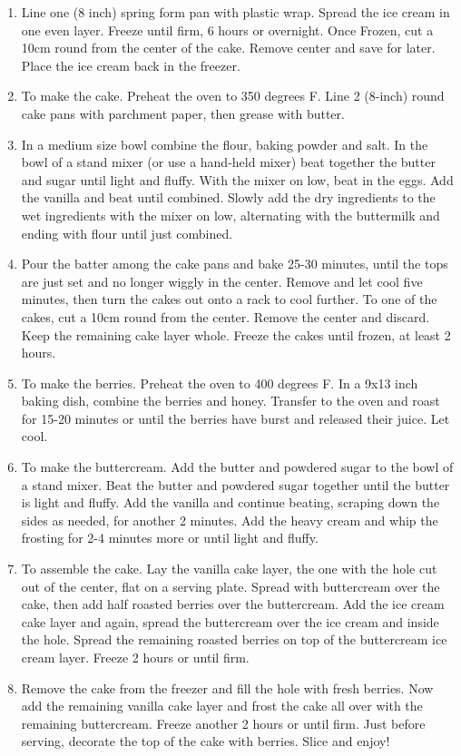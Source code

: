 \documentclass[
  letterpaper,
  DIV=11,
  numbers=noendperiod,
  titlepage=false]{scrreprt}
\providecommand{\tightlist}{%
  \setlength{\itemsep}{0pt}\setlength{\parskip}{0pt}}\usepackage{longtable,booktabs,array}
\begin{document}
\begin{enumerate}
\def\labelenumi{\arabic{enumi}.}
\tightlist
\item
  Line one (8 inch) spring form pan with plastic wrap. Spread the ice
  cream in one even layer. Freeze until firm, 6 hours or overnight. Once
  Frozen, cut a 10cm round from the center of the cake. Remove center
  and save for later. Place the ice cream back in the freezer.
\item
  To make the cake. Preheat the oven to 350 degrees F. Line 2 (8-inch)
  round cake pans with parchment paper, then grease with butter.
\item
  In a medium size bowl combine the flour, baking powder and salt. In
  the bowl of a stand mixer (or use a hand-held mixer) beat together the
  butter and sugar until light and fluffy. With the mixer on low, beat
  in the eggs. Add the vanilla and beat until combined. Slowly add the
  dry ingredients to the wet ingredients with the mixer on low,
  alternating with the buttermilk and ending with flour until just
  combined.
\item
  Pour the batter among the cake pans and bake 25-30 minutes, until the
  tops are just set and no longer wiggly in the center. Remove and let
  cool five minutes, then turn the cakes out onto a rack to cool
  further. To one of the cakes, cut a 10cm round from the center. Remove
  the center and discard. Keep the remaining cake layer whole. Freeze
  the cakes until frozen, at least 2 hours.
\item
  To make the berries. Preheat the oven to 400 degrees F. In a 9x13 inch
  baking dish, combine the berries and honey. Transfer to the oven and
  roast for 15-20 minutes or until the berries have burst and released
  their juice. Let cool.
\item
  To make the buttercream. Add the butter and powdered sugar to the bowl
  of a stand mixer. Beat the butter and powdered sugar together until
  the butter is light and fluffy. Add the vanilla and continue beating,
  scraping down the sides as needed, for another 2 minutes. Add the
  heavy cream and whip the frosting for 2-4 minutes more or until light
  and fluffy.
\item
  To assemble the cake. Lay the vanilla cake layer, the one with the
  hole cut out of the center, flat on a serving plate. Spread with
  buttercream over the cake, then add half roasted berries over the
  buttercream. Add the ice cream cake layer and again, spread the
  buttercream over the ice cream and inside the hole. Spread the
  remaining roasted berries on top of the buttercream ice cream layer.
  Freeze 2 hours or until firm.
\item
  Remove the cake from the freezer and fill the hole with fresh berries.
  Now add the remaining vanilla cake layer and frost the cake all over
  with the remaining buttercream. Freeze another 2 hours or until firm.
  Just before serving, decorate the top of the cake with berries. Slice
  and enjoy!
\end{enumerate}
\end{document}
